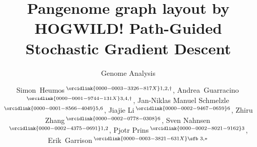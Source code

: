 \documentclass{bioinfo}
\theoremstyle{definition}
\begin{document}

\subtitle{Genome Analysis}

\title[Pangenome graph layout by HOGWILD! Path-Guided Stochastic Gradient Descent]{Pangenome graph layout by HOGWILD! Path-Guided Stochastic Gradient Descent}
\author[Heumos, Guarracino \textit{et~al}.]{
Simon~Heumos\,$^{\orcidlink{0000-0003-3326-817X}1,2,\dagger}$,
Andrea~Guarracino\,$^{\orcidlink{0000-0001-9744-131X}3,4,\dagger}$,
Jan-Niklas Manuel Schmelzle\,$^{\orcidlink{0000-0001-8566-4049}5,6}$,
Jiajie Li\,$^{\orcidlink{0000-0002-9467-0659}6}$,
Zhiru Zhang\,$^{\orcidlink{0000-0002-0778-0308}6}$,
Sven Nahnsen\,$^{\orcidlink{0000-0002-4375-0691}1,2}$,
Pjotr Prins\,$^{\orcidlink{0000-0002-8021-9162}3}$,
Erik~Garrison\,$^{\orcidlink{0000-0003-3821-631X}\text{\sfb 3},*}$
}

\address{
$^1$Quantitative Biology Center (QBiC), University of Tübingen, Tübingen 72076, Germany \\
$^2$Biomedical Data Science, Department of Computer Science, University of Tübingen, Tübingen 72076, Germany \\
$^3$Department of Genetics, Genomics and Informatics, University of Tennessee Health Science Center, Memphis, TN 38163, USA \\
$^4$Genomics Research Centre, Human Technopole, Milan 20157, Italy \\
$^5$Department of Computer Engineering, School of Computation, Information and Technology (CIT), Technical University of Munich, Munich 80333, Germany \\
$^6$School of Electrical and Computer Engineering, Cornell University, Ithaca, NY 14853, USA \\
}



\end{document}

